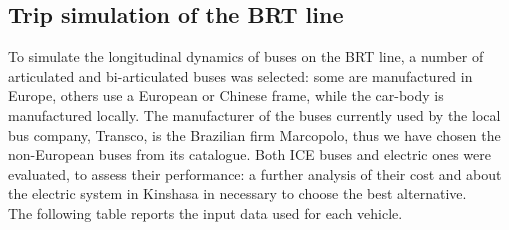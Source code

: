 \documentclass{article}
\begin{document}
\subsection{Trip simulation of the BRT line}
To simulate the longitudinal dynamics of buses on the BRT line, a number of articulated and bi-articulated buses was selected: some are manufactured in Europe, others use a European or Chinese frame, while the car-body is manufactured locally. The manufacturer of the buses currently used by the local bus company, Transco, is the Brazilian firm Marcopolo\cite{marcopolo}, thus we have chosen the non-European buses from its catalogue. Both ICE buses and electric ones were evaluated, to assess their performance: a further analysis of their cost and about the electric system in Kinshasa in necessary to choose the best alternative.\\
The following table reports the input data used for each vehicle.\\
\\
\end{document}
